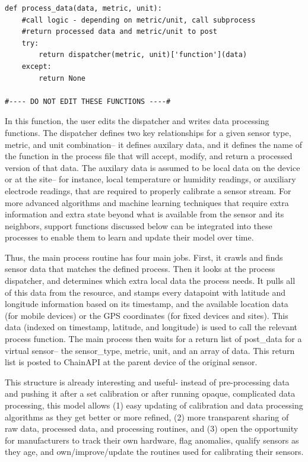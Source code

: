 \begin{lstlisting}[style=code]
def process_data(data, metric, unit):
    #call logic - depending on metric/unit, call subprocess
    #return processed data and metric/unit to post
    try:
        return dispatcher(metric, unit)['function'](data)
    except:
        return None

#---- DO NOT EDIT THESE FUNCTIONS ----#
\end{lstlisting}

In this function, the user edits the dispatcher and writes data processing functions.  The dispatcher defines two key relationships for a given sensor type, metric, and unit combination-- it defines auxilary data, and it defines the name of the function in the process file that will accept, modify, and return a processed version of that data.  The auxilary data is assumed to be local data on the device or at the site-- for instance, local temperature or humidity readings, or auxiliary electrode readings, that are required to properly calibrate a sensor stream.  For more advanced algorithms and machine learning techniques that require extra information and extra state beyond what is available from the sensor and its neighbors, support functions discussed below can be integrated into these processes to enable them to learn and update their model over time.

Thus, the main process routine has four main jobs.  First, it crawls and finds sensor data that matches the defined process.  Then it looks at the process dispatcher, and determines which extra local data the process needs.  It pulls all of this data from the resource, and stamps every datapoint with latitude and longitude information based on its timestamp, and the available location data (for mobile devices) or the GPS coordinates (for fixed devices and sites).  This data (indexed on timestamp, latitude, and longitude) is used to call the relevant process function.  The main process then waits for a return list of post\_data for a virtual sensor-- the sensor\_type, metric, unit, and an array of data.  This return list is posted to ChainAPI at the parent device of the original sensor.     

This structure is already interesting and useful- instead of pre-processing data and pushing it after a set calibration or after running opaque, complicated data processing, this model allows (1) easy updating of calibration and data processing algorithms as they get better or more refined, (2) more transparent sharing of raw data, processed data, and processing routines, and (3) open the opportunity for manufacturers to track their own hardware, flag anomalies, qualify sensors as they age, and own/improve/update the routines used for calibrating their sensors.   

